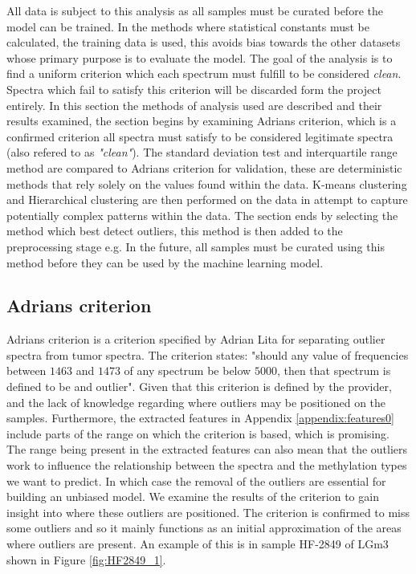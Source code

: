 All data is subject to this analysis as all samples must be curated before the model can be trained. In the methods where statistical constants must be calculated, the training data is used, this avoids bias towards the other datasets whose primary purpose is to evaluate the model. The goal of the analysis is to find a uniform criterion which each spectrum must fulfill to be considered \textit{clean}. Spectra which fail to satisfy this criterion will be discarded form the project entirely. In this section the methods of analysis used are described and their results examined, the section begins by examining Adrians criterion, which is a confirmed criterion all spectra must satisfy to be considered legitimate spectra (also refered to as \textit{"clean"}). The standard deviation test and interquartile range method are compared to Adrians criterion for validation, these are deterministic methods that rely solely on the values found within the data. K-means clustering and Hierarchical clustering are then performed on the data in attempt to capture potentially complex patterns within the data. The section ends by selecting the method which best detect outliers, this method is then added to the preprocessing stage e.g. In the future, all samples must be curated using this method before they can be used by the machine learning model.

\subsection{Adrians criterion}

Adrians criterion is a criterion specified by Adrian Lita for separating outlier spectra from tumor spectra. The criterion states: "should any value of frequencies between $1463$ and $1473$ of any spectrum be below $5000$, then that spectrum is defined to be and outlier". Given that this criterion is defined by the provider, and the lack of knowledge regarding where outliers may be positioned on the samples. Furthermore, the extracted features in Appendix \ref{appendix:features0} include parts of the range on which the criterion is based, which is promising. The range being present in the extracted features can also mean that the outliers work to influence the relationship between the spectra and the methylation types we want to predict. In which case the removal of the outliers are essential for building an unbiased model. We examine the results of the criterion to gain insight into where these outliers are positioned. The criterion is confirmed to miss some outliers and so it mainly functions as an initial approximation of the areas where outliers are present. An example of this is in sample HF-2849 of LGm3 shown in Figure \ref{fig:HF2849_1}.

